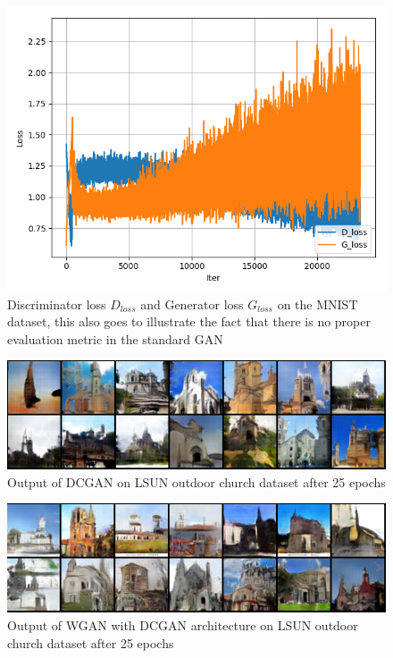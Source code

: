 \documentclass{article}
\begin{document}
\begin{figure}[H]
    \centering
    \includegraphics[width=0.9\linewidth]{GAN_loss.png}
    \caption{Discriminator loss $D_{loss}$ and Generator loss $G_{loss}$ on the MNIST dataset, this also goes to illustrate the fact that there is no proper evaluation metric in the standard GAN}
    \label{fig:my_label}
\end{figure}
\begin{figure}[H]
    \centering
    \includegraphics[width=0.9\linewidth]{display_sample_LSUN_DCGAN.png}
    \caption{Output of DCGAN on LSUN outdoor church dataset after 25 epochs}
    \label{fig:my_label}
\end{figure}
\begin{figure}[H]
    \centering
    \includegraphics[width=0.9\linewidth]{display_WGAN_LUSN.png}
    \caption{Output of WGAN with DCGAN architecture on LSUN outdoor church dataset after 25 epochs}
    \label{fig:my_label}
\end{figure}
\end{document}
